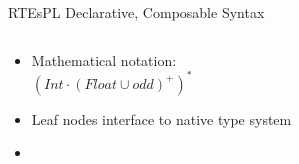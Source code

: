 \begin{frame}[t]{RTEs}{PL Declarative, Composable Syntax}
  \begin{columns}
    \begin{column}{0.55\textwidth}
  \begin{itemize}
  \item Mathematical notation:\\
  \quad\textcolor{greeny}{$(Int \cdot (Float \cup odd)^+)^*$}

  \item Leaf nodes interface to native type system

  \item {}%
  \end{itemize}
    \end{column}%
    \begin{column}{0.45\textwidth}
      \scalebox{0.7}{}
    \end{column}%
  \end{columns}%
\end{frame}


\newsavebox\exampleAbox
\begin{lrbox}{\exampleAbox}
  \begin{minipage}{12cm}
    
  \end{minipage}
\end{lrbox}



\newsavebox\exampleAbbox
\begin{lrbox}{\exampleAbbox}
  \begin{minipage}{12cm}
    
  \end{minipage}
\end{lrbox}



\newsavebox\exampleAcbox
\begin{lrbox}{\exampleAcbox}
  \begin{minipage}{12cm}
    
  \end{minipage}
\end{lrbox}



\newsavebox\exampleAdbox
\begin{lrbox}{\exampleAdbox}
  \begin{minipage}{12cm}
    
  \end{minipage}
\end{lrbox}




\newsavebox\extendedbox
\begin{lrbox}{\extendedbox}
  \begin{minipage}{12cm}
  
  \end{minipage}
\end{lrbox}
